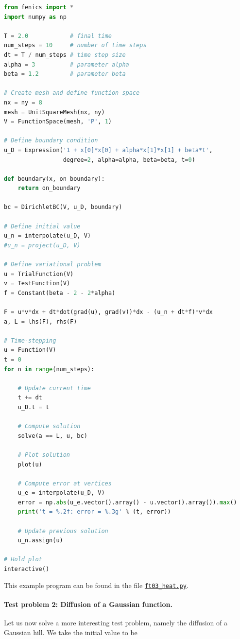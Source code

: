 \documentclass[graybox,envcountchap,sectrefs,final]{svmonodo}
\begin{document}
\begin{lstlisting}[language=Python,style=graycolor]
from fenics import *
import numpy as np

T = 2.0            # final time
num_steps = 10     # number of time steps
dt = T / num_steps # time step size
alpha = 3          # parameter alpha
beta = 1.2         # parameter beta

# Create mesh and define function space
nx = ny = 8
mesh = UnitSquareMesh(nx, ny)
V = FunctionSpace(mesh, 'P', 1)

# Define boundary condition
u_D = Expression('1 + x[0]*x[0] + alpha*x[1]*x[1] + beta*t',
                 degree=2, alpha=alpha, beta=beta, t=0)

def boundary(x, on_boundary):
    return on_boundary

bc = DirichletBC(V, u_D, boundary)

# Define initial value
u_n = interpolate(u_D, V)
#u_n = project(u_D, V)

# Define variational problem
u = TrialFunction(V)
v = TestFunction(V)
f = Constant(beta - 2 - 2*alpha)

F = u*v*dx + dt*dot(grad(u), grad(v))*dx - (u_n + dt*f)*v*dx
a, L = lhs(F), rhs(F)

# Time-stepping
u = Function(V)
t = 0
for n in range(num_steps):

    # Update current time
    t += dt
    u_D.t = t

    # Compute solution
    solve(a == L, u, bc)

    # Plot solution
    plot(u)

    # Compute error at vertices
    u_e = interpolate(u_D, V)
    error = np.abs(u_e.vector().array() - u.vector().array()).max()
    print('t = %.2f: error = %.3g' % (t, error))

    # Update previous solution
    u_n.assign(u)

# Hold plot
interactive()
\end{lstlisting}
This example program can be found in the file \href{{https://fenicsproject.org/pub/tutorial/python/vol1/ft03_heat.py}}{\nolinkurl{ft03_heat.py}}.


\paragraph{Test problem 2: Diffusion of a Gaussian function.}
Let us now solve a more interesting test problem, namely the diffusion of
a Gaussian hill. We take the initial value to be
\end{document}
